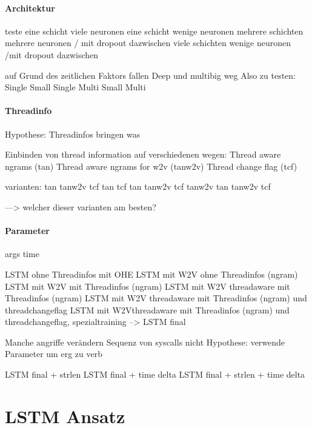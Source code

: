             \paragraph{Architektur}
                teste eine schicht viele neuronen 
                eine schicht wenige neuronen
                mehrere schichten mehrere neuronen / mit dropout dazwischen
                viele schichten wenige neuronen /mit dropout dazwischen

                auf Grund des zeitlichen Faktors fallen Deep und multibig weg
                Also zu testen:
                Single Small
                Single 
                Multi Small
                Multi 

            \paragraph{Threadinfo}
                Hypothese:
                Threadinfos bringen was

                Einbinden von thread information auf verschiedenen wegen:
                Thread aware ngrams (tan)
                Thread aware ngrams for w2v (tanw2v)
                Thread change flag (tcf)

                varianten:
                tan
                tanw2v
                tcf
                tan tcf
                tan tanw2v
                tcf tanw2v
                tan tanw2v tcf

                ---> welcher dieser varianten am besten?

            \paragraph{Parameter}
                args
                time

                LSTM ohne Threadinfos mit OHE
                LSTM mit W2V ohne Threadinfos (ngram)
                LSTM mit W2V mit Threadinfos (ngram)
                LSTM mit W2V threadaware mit Threadinfos (ngram)
                LSTM mit W2V threadaware mit Threadinfos (ngram) und threadchangeflag
                LSTM mit W2Vthreadaware mit Threadinfos (ngram) und threadchangeflag, spezialtraining
                --> LSTM final

                Manche angriffe verändern Sequenz von syscalls nicht
                Hypothese:
                verwende Parameter um erg zu verb

                LSTM final + strlen
                LSTM final + time delta
                LSTM final + strlen + time delta
    \section{LSTM Ansatz}
\fi


